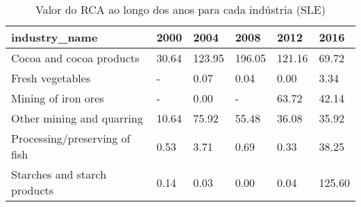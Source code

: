 \begin{table}
\centering
\caption{Valor do RCA ao longo dos anos para cada indústria (SLE)}
\begin{tabular}{p{6cm}p{1.5cm}p{1.5cm}p{1.5cm}p{1.5cm}p{1.5cm}}
\toprule
                industry\_name &  2000 &   2004 &   2008 &   2012 &   2016 \\
\midrule
     Cocoa and cocoa products & 30.64 & 123.95 & 196.05 & 121.16 &  69.72 \\
             Fresh vegetables &     - &   0.07 &   0.04 &   0.00 &   3.34 \\
          Mining of iron ores &     - &   0.00 &      - &  63.72 &  42.14 \\
    Other mining and quarring & 10.64 &  75.92 &  55.48 &  36.08 &  35.92 \\
Processing/preserving of fish &  0.53 &   3.71 &   0.69 &   0.33 &  38.25 \\
 Starches and starch products &  0.14 &   0.03 &   0.00 &   0.04 & 125.60 \\
\bottomrule
\end{tabular}
\end{table}

